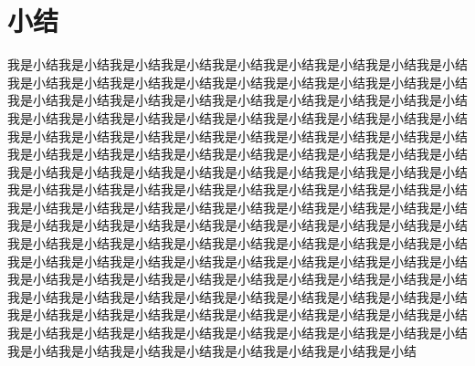 \chapter{小\qquad 结}

我是小结我是小结我是小结我是小结我是小结我是小结我是小结我是小结我是小结我是小结我是小结我是小结我是小结我是小结我是小结我是小结我是小结我是小结我是小结我是小结我是小结我是小结我是小结我是小结我是小结我是小结我是小结我是小结我是小结我是小结我是小结我是小结我是小结我是小结我是小结我是小结我是小结我是小结我是小结我是小结我是小结我是小结我是小结我是小结我是小结我是小结我是小结我是小结我是小结我是小结我是小结我是小结我是小结我是小结我是小结我是小结我是小结我是小结我是小结我是小结我是小结我是小结我是小结我是小结我是小结我是小结我是小结我是小结我是小结我是小结我是小结我是小结我是小结我是小结我是小结我是小结我是小结我是小结我是小结我是小结我是小结我是小结我是小结我是小结我是小结我是小结我是小结我是小结我是小结我是小结我是小结我是小结我是小结我是小结我是小结我是小结我是小结我是小结我是小结我是小结我是小结我是小结我是小结我是小结我是小结我是小结我是小结我是小结我是小结我是小结我是小结我是小结我是小结我是小结我是小结我是小结我是小结我是小结我是小结我是小结我是小结我是小结我是小结我是小结我是小结我是小结我是小结我是小结我是小结我是小结我是小结我是小结我是小结我是小结我是小结我是小结我是小结我是小结我是小结我是小结我是小结我是小结我是小结我是小结我是小结我是小结我是小结我是小结我是小结我是小结我是小结我是小结
